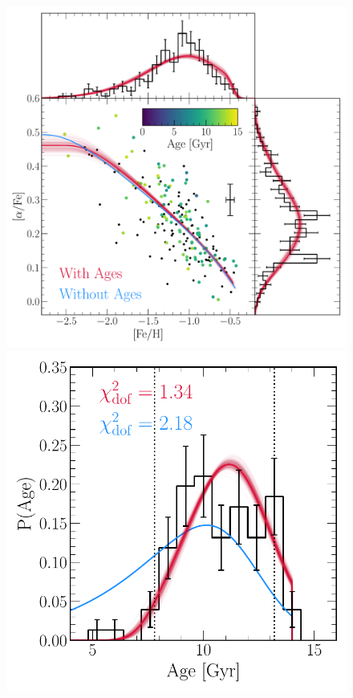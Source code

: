 \documentclass[foo.tex]{subfiles}
\begin{document}
\begin{figure}
\centering
\includegraphics[scale = 0.65]{gsefit_afe_feh.pdf}
\includegraphics[scale = 0.54]{gsefit_agedist.pdf}

\end{figure}
\end{document}
